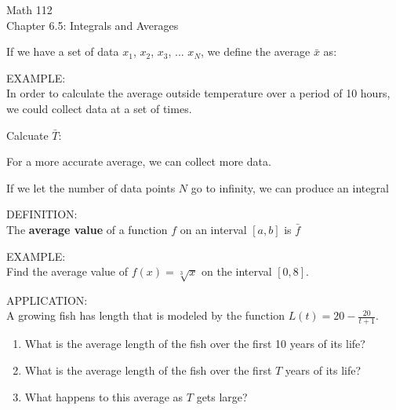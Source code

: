 \documentclass[11pt]{article}
\begin{document}
\begin{center}
\Large
\rm{Math 112}
\\
\rm{Chapter 6.5:  Integrals and Averages}
\\
\end{center}
\vspace{0.2in}

If we have a set of data $x_1$, $x_2$, $x_3$,  ...  $x_N$, we define the average $\bar{x}$ as:\\

\vspace{0.25in}


EXAMPLE:\\

In order to calculate the average outside temperature over a period of 10 hours, we could collect data at a set of times.\\


\vspace{1.5in}

Calcuate $\bar{T}$:\\

\vspace{.25in}

For a more accurate average, we can collect more data.

\vspace{2.5in}

If we let the number of data points $N$ go to infinity, we can produce an integral

\pagebreak

DEFINITION:\\

The {\bf average value} of a function $f$ on an interval $[a,b]$ is $\bar{f}$\\

\vspace{1.5in}


EXAMPLE: \\

Find the average value of $f(x) = \sqrt[3]{x} $ on the interval $[0,8]$.\\

\vspace{1.5in}

APPLICATION:\\

A growing fish has length that is modeled by the function $L(t) = 20 - \frac{20}{t+1}$.\\
\begin{enumerate}
\item{What is the average length of the fish over the first 10 years of its life?}
\item{What is the average length of the fish over the first $T$ years of its life?}
\item{What happens to this average as $T$ gets large?}

\end{enumerate}
\end{document}
